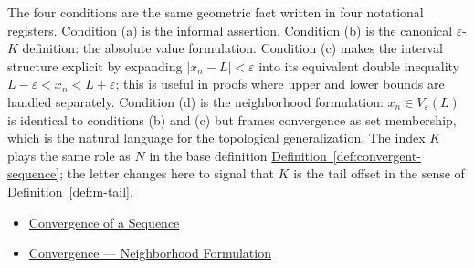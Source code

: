 \begin{remark*}[Interpretation]
The four conditions are the same geometric fact written in four
notational registers. Condition (a) is the informal assertion.
Condition (b) is the canonical $\varepsilon$-$K$ definition: the
absolute value formulation. Condition (c) makes the interval
structure explicit by expanding $|x_n - L| < \varepsilon$ into its
equivalent double inequality $L - \varepsilon < x_n < L +
\varepsilon$; this is useful in proofs where upper and lower bounds
are handled separately. Condition (d) is the neighborhood
formulation: $x_n \in V_\varepsilon(L)$ is identical to conditions
(b) and (c) but frames convergence as set membership, which is the
natural language for the topological generalization. The index $K$
plays the same role as $N$ in the base definition
\hyperref[def:convergent-sequence]{Definition~\ref*{def:convergent-sequence}};
the letter changes here to signal that $K$ is the tail offset in
the sense of \hyperref[def:m-tail]{Definition~\ref*{def:m-tail}}.
\end{remark*}

\begin{dependencies}
\begin{itemize}
  \item \hyperref[def:convergent-sequence]{Convergence of a Sequence}
  \item \hyperref[def:convergent-sequence-neighborhood]{Convergence --- Neighborhood Formulation}
\end{itemize}
\end{dependencies}





















